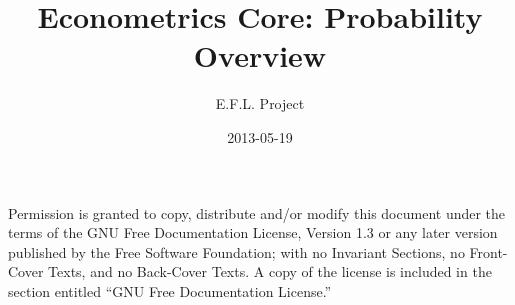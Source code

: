 \documentclass[nofonts]{tufte-latex/tufte-handout}
\title{Econometrics Core: Probability Overview}
\author{E.F.L. Project}
\date{2013-05-19}
\begin{document}
\maketitle
\tableofcontents

  Permission is granted to
copy, distribute and/or modify this document under the terms of the
GNU Free Documentation License, Version 1.3 or any later version
published by the Free Software Foundation; with no Invariant Sections,
no Front-Cover Texts, and no Back-Cover Texts.  A copy of the license
is included in the section entitled ``GNU Free Documentation
License.''






\appendix

\end{document}
